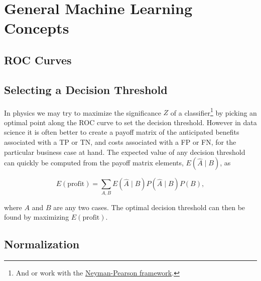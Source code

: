 \section{General Machine Learning Concepts}
\label{additional:ml:general}

\subsection{ROC Curves}
\label{additional:ml:general:eval:ROC}

\subsection{Selecting a Decision Threshold}
\label{additional:ml:general:eval:decision_threshold}


In physics we may try to maximize the significance $Z$ of a classifier\footnote{And or
work with the \href{https://en.wikipedia.org/wiki/Neyman\%E2\%80\%93Pearson\_lemma}{Neyman-Pearson framework}.} by
picking an optimal point along the ROC curve to set the decision threshold.
However in data science it is often better to create a payoff matrix of the anticipated
benefits associated with a TP or TN, and costs associated with a FP or FN,
for the particular business case at hand.
The expected value of any decision threshold can quickly be computed
from the payoff matrix elements, $E\left( \hat{A} \mid B\right)$, as

\begin{equation} \label{eq:E_profit}
E\left(\text{profit}\right) = \sum_{A,B} E\left( \hat{A} \mid B\right) P\left(\hat{A} \mid B \right) P\left(B\right),
\end{equation}

\noindent where $A$ and $B$ are any two cases.
The optimal decision threshold can then be found by maximizing $E\left(\text{profit}\right)$.

\subsection{Normalization}
\label{additional:ml:general:normalization}

